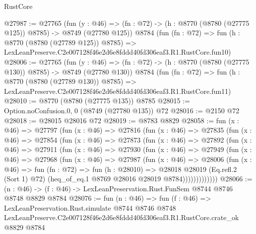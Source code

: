 \begin{lexlean}{RustCore}
\begin{coremodule}
@27987 := @27765
    (fun (y : @46) => (fn : @72) -> (h : @8770 (@8780 (@27775 @125)) @8785) -> @8749 (@27780 @125))
    @8784
    (fun (fn : @72) =>
    fun (h : @8770 (@8780 (@27789 @125)) @8785) =>
    LexLeanPreserve.C2e007128f46e2d6e8fddd40fd306eaf3.R1.RustCore.fun10)
@28006 := @27765
    (fun (y : @46) => (fn : @72) -> (h : @8770 (@8780 (@27775 @130)) @8785) -> @8749 (@27780 @130))
    @8784
    (fun (fn : @72) =>
    fun (h : @8770 (@8780 (@27789 @130)) @8785) =>
    LexLeanPreserve.C2e007128f46e2d6e8fddd40fd306eaf3.R1.RustCore.fun11)
@28010 := @8770 (@8780 (@27775 @135)) @8785
@28015 := Option.noConfusion.{0, 0} (@8749 (@27780 @135)) @72
@28016 := @2150 @72
@28018 := @28015 @28016 @72
@28019 := @8783 @8829
@28058 := fun (x : @46) =>
  @27797
    (fun (x : @46) =>
    @27816
      (fun (x : @46) =>
      @27835
        (fun (x : @46) =>
        @27854
          (fun (x : @46) =>
          @27873
            (fun (x : @46) =>
            @27892
              (fun (x : @46) =>
              @27911
                (fun (x : @46) =>
                @27930
                  (fun (x : @46) =>
                  @27949
                    (fun (x : @46) =>
                    @27968
                      (fun (x : @46) =>
                      @27987
                        (fun (x : @46) =>
                        @28006
                          (fun (x : @46) =>
                          fun (fn : @72) =>
                          fun (h : @28010) =>
                          @28018
                            @28019
                            (Eq.refl.{2} (Sort 1) @72)
                            (heq_of_eq.{1} @8769 @28016 @28019 @8784)))))))))))))
@28066 := (n : @46) -> (f : @46) -> LexLeanPreservation.Rust.FunSem @8744 @8746 @8748 @8829 @8784
@28076 := fun (n : @46) =>
  fun (f : @46) =>
  LexLeanPreservation.Rust.simulate
    @8744
    @8746
    @8748
    LexLeanPreserve.C2e007128f46e2d6e8fddd40fd306eaf3.R1.RustCore.crate_ok
    @8829
    @8784
\end{coremodule}
\end{lexlean}
